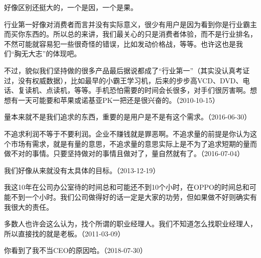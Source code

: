 好像区别还挺大的，一个是因，一个是果。

行业第一好像对消费者而言并没有实际意义，很少有用户是因为看到你是行业霸主而买你东西的。所以总的来讲，我们最关心的只是消费者体验，而不是行业排名，不然可能就容易犯一些很奇怪的错误，比如发动价格战，等等。也许这也是我们“胸无大志”的体现吧。

不过，貌似我们坚持做的很多产品最后据说都成了“行业第一”（其实没认真考证过，没有权威数据），比如最早的小霸王学习机，后来的步步高VCD、DVD、电话、复读机、点读机，等等。手机恐怕需要的时间会长很多，对手们很厉害啊。想想有一天可能要和苹果或诺基亚PK一把还是很兴奋的。（2010-10-15）


量本来就不是我们追求的东西，重要的是用户是不是有这个需求。（2016-06-30）


不追求利润不等于不要利润。企业不赚钱就是罪恶啊。不追求量的前提是你认为这个市场有需求，就是有量的意思，不追求量的意思实际上是不为了追求短期的量而做不对的事情。只要坚持做对的事情且做对了，量自然就有了。（2016-07-04）


我们好像从来就没有太具体的目标。（2013-12-19）


我这10年在公司办公室待的时间总和可能还不到10个小时，在OPPO的时间总和可能不到一个小时。我们公司做得好的话一定是大家的功劳，但如果做不好则确实有我很大的责任。


多数人也许会这么认为，找个所谓的职业经理人。我们不知道怎么找职业经理人，所以直接找的就是老板。（2011-03-09）


你看到了我不当CEO的原因哈。（2018-07-30）


